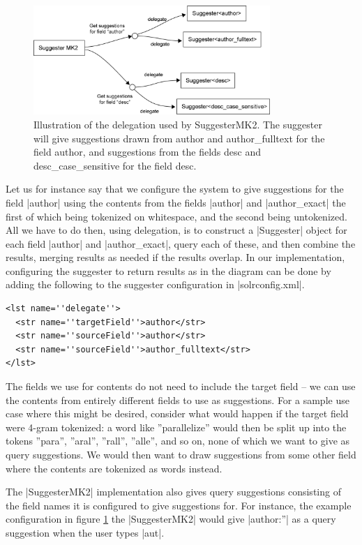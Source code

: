 \begin{figure}[h!]
    \centering
    \includegraphics[width=0.8\textwidth]{img/delegation.png}
    \caption{Illustration of the delegation used by SuggesterMK2. The suggester will give suggestions drawn from author and author\_fulltext for the field author, and suggestions from the fields desc and desc\_case\_sensitive for the field desc.}
    \label{fig:delegation}
\end{figure}

Let us for instance say that we configure the system to give suggestions for the field |author| using the contents from the fields |author| and |author_exact| the first of which being tokenized on whitespace, and the second being untokenized. All we have to do then, using delegation, is to construct a |Suggester| object for each field |author| and |author_exact|, query each of these, and then combine the results, merging results as needed if the results overlap. In our implementation, configuring the suggester to return results as in the diagram can be done by adding the following to the suggester configuration in |solrconfig.xml|.

\begin{verbatim}
<lst name=''delegate''>
  <str name=''targetField''>author</str>
  <str name=''sourceField''>author</str>
  <str name=''sourceField''>author_fulltext</str>
</lst>
\end{verbatim}

The fields we use for contents do not need to include the target field – we can use the contents from entirely different fields to use as suggestions. For a sample use case where this might be desired, consider what would happen if the target field were 4-gram tokenized: a word like ''parallelize'' would then be split up into the tokens ''para'', ''aral'', ''rall'', ''alle'', and so on, none of which we want to give as query suggestions. We would then want to draw suggestions from some other field where the contents are tokenized as words instead.

The |SuggesterMK2| implementation also gives query suggestions consisting of the field names it is configured to give suggestions for. For instance, the example configuration in figure \ref{fig:delegation} the |SuggesterMK2| would give |author:”| as a query suggestion when the user types |aut|.

